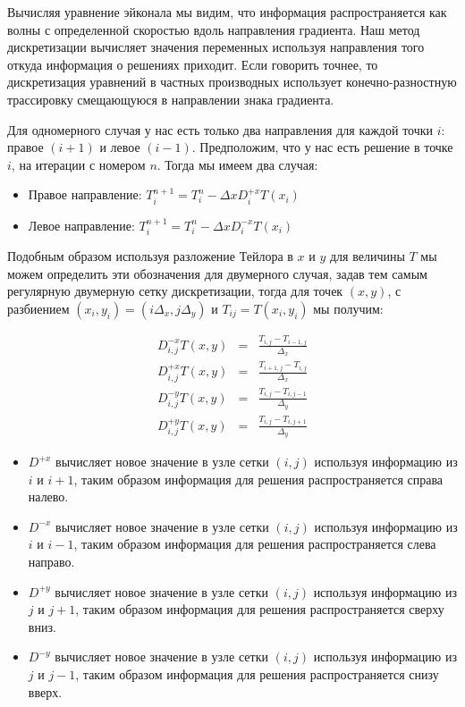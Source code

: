 Вычисляя уравнение эйконала мы видим, что информация распространяется
как волны с определенной скоростью вдоль направления градиента. Наш
метод дискретизации вычисляет значения переменных используя
направления того откуда информация о решениях приходит. Если говорить
точнее, то дискретизация уравнений в частных производных использует
конечно-разностную трассировку смещающуюся в направлении знака
градиента.

Для одномерного случая у нас есть только два направления для каждой
точки $i$: правое $(i+1)$ и левое $(i - 1)$. Предположим, что у нас
есть решение в точке $i$, на итерации с номером $n$. Тогда мы имеем
два случая:
\begin{itemize}
\item Правое направление: $T_i^{n+1} = T_i^n - \Delta x D^{+x}_iT(x_i)$
\item Левое направление: $T_i^{n+1} = T_i^n - \Delta x D^{-x}_iT(x_i)$
\end{itemize}


Подобным образом используя разложение Тейлора в $x$ и $y$ для
величины $T$ мы можем определить эти обозначения для двумерного
случая, задав тем самым регулярную двумерную сетку дискретизации,
тогда для точек $(x,y)$, с разбиением
$(x_i,y_i) = (i\Delta_x,j \Delta_y)$ и $T_{ij} = T(x_i,y_i)$ мы
получим:

\begin{equation}
  \begin{aligned}
  \label{eq:discrete-defines}
    D^{-x}_{i,j}T(x,y)& =& \frac{T_{i,j} - T_{i-1,j}}{\Delta_x}  \\
    D^{+x}_{i,j}T(x,y)& =& \frac{T_{i+1,j} - T_{i,j}}{\Delta_x}  \\
    D^{-y}_{i,j}T(x,y) &=& \frac{T_{i,j} - T_{i,j-1}}{\Delta_y}  \\
    D^{+y}_{i,j}T(x,y) &=& \frac{T_{i,j} - T_{i,j+1}}{\Delta_y}
    \end{aligned}
\end{equation}

\begin{itemize}
\item $D^{+x}$ вычисляет новое значение в узле сетки $(i,j)$ используя
  информацию из $i$ и $i+1$, таким образом информация для решения
  распространяется справа налево.

\item $D^{-x}$ вычисляет новое значение в узле сетки $(i,j)$ используя
  информацию из $i$ и $i-1$, таким образом информация для решения
  распространяется слева направо.
\item $D^{+y}$ вычисляет новое значение в узле сетки $(i,j)$ используя
  информацию из $j$ и $j+1$, таким образом информация для решения
  распространяется сверху вниз.

\item $D^{-y}$ вычисляет новое значение в узле сетки $(i,j)$ используя
  информацию из $j$ и $j-1$, таким образом информация для решения
  распространяется снизу вверх.

\end{itemize}

